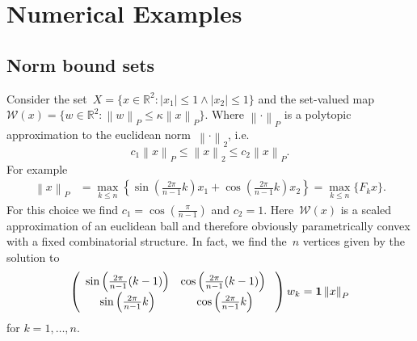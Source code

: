 \documentclass[smallextended]{svjour3}       %
\numberwithin{equation}{section}
\providecommand{\norm}[1]{\left\|#1\right\|}
\providecommand{\abs}[1]{\left|#1\right|}
\begin{document}
\section{Numerical Examples}\label{sec:numerical:examples}
\subsection{Norm bound sets}\label{ssec:example:one}
%
Consider the set~$X = \{x\in\mathbb R^2: \abs{x_1}\leq 1\wedge \abs{x_2}\leq 1\}$ and the set-valued map $\mathcal W(x) = \{w\in\mathbb R^2: \norm{w}_P\leq\kappa\norm{x}_P\}$.
%
Where $\norm{\cdot}_P$ is a polytopic approximation to the euclidean norm~$\norm{\cdot}_2$, i.e.
%
$$
c_1 \norm{x}_P\leq\norm{x}_2\leq c_2\norm{x}_P.
$$
%
For example
%
$$\begin{aligned}
\norm{x}_P &= \max_{k\leq n}\left\{\sin\left(\frac{2\pi}{n-1}k\right) x_1 + \cos\left(\frac{2\pi}{n-1}k\right) x_2\right\} = \max_{k\leq n}\{F_k x\}.
\end{aligned}$$
%
For this choice we find $c_1 = \cos\left(\frac{\pi}{n-1}\right)$ and $c_2=1$.
%
Here~$\mathcal W(x)$ is a scaled approximation of an euclidean ball and therefore obviously parametrically convex with a fixed combinatorial structure.
%
In fact, we find the~$n$ vertices given by the solution to
%
$$
  \left(\begin{array}{cc}
  \sin\left(\frac{2\pi}{n-1}(k-1)\right) & \cos\left(\frac{2\pi}{n-1}(k-1)\right) \\
  \sin\left(\frac{2\pi}{n-1}k\right) & \cos\left(\frac{2\pi}{n-1}k\right)
  \end{array}
  \right) w_k = {\bf{1}}\norm{x}_P
$$
%
for $k=1,\dots,n$.
\end{document}

